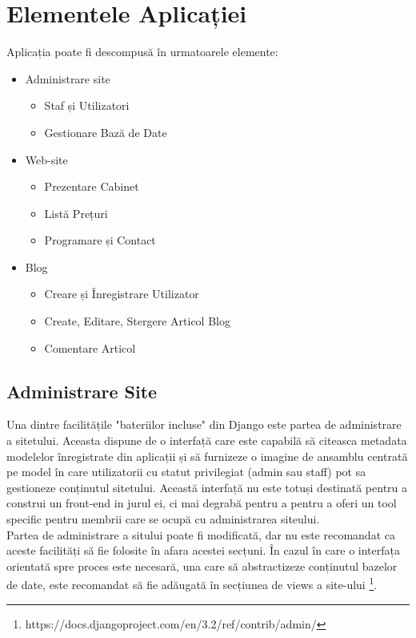 \documentclass[11pt]{scrartcl} %
\begin{document}
\section{Elementele Aplicației}

Aplicația poate fi descompusă în urmatoarele elemente:


\begin{itemize}
	\item Administrare site
		\begin{itemize}
			\item Staf și Utilizatori
			\item Gestionare Bază de Date
		\end{itemize}
	\item Web-site
		\begin{itemize}
			\item Prezentare Cabinet
			\item Listă Prețuri
			\item Programare și Contact
		\end{itemize}
	\item Blog
		\begin{itemize}
			\item Creare și Înregistrare Utilizator
			\item Create, Editare, Stergere Articol Blog
			\item Comentare Articol
		\end{itemize}
\end{itemize}


\subsection{Administrare Site}


Una dintre facilitățile "bateriilor incluse" din Django este partea de administrare a sitetului. Aceasta dispune de o interfață care este capabilă să citeasca metadata modelelor înregistrate din aplicații și să furnizeze o imagine de ansamblu centrată pe model în care utilizatorii cu statut privilegiat (admin sau staff) pot sa gestioneze conținutul sitetului. Această interfață nu este totuși destinată pentru a construi un front-end in jurul ei, ci mai degrabă pentru a pentru a oferi un tool specific pentru membrii care se ocupă cu administrarea siteului.\\
Partea de administrare a sitului poate fi modificată, dar nu este recomandat ca aceste facilități să fie folosite în afara acestei secțuni. În cazul în care o interfața orientată spre proces este necesară, una care să abstractizeze conținutul bazelor de date, este recomandat să fie adăugată în secțiunea de views a site-ului \footnote{https://docs.djangoproject.com/en/3.2/ref/contrib/admin/}. 
\end{document}
